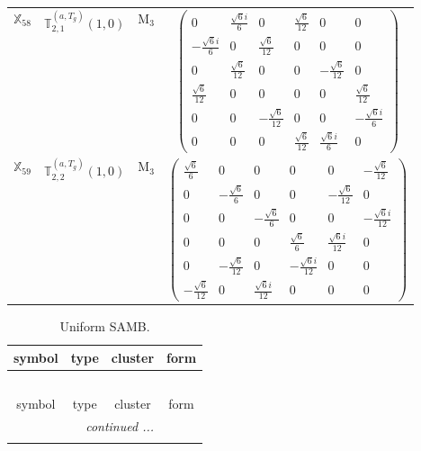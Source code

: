 \documentclass[fleqn,10pt,landscape]{article}
\begin{document}
\begin{itemize}
\begin{center}
\begin{longtable}{c|c|c|c}
$ \mathbb{X}_{58} $ & $\mathbb{T}_{2,1}^{(a,T_{g})}(1,0)$ & M$_{3}$ & $\begin{pmatrix} 0 & \frac{\sqrt{6} i}{6} & 0 & \frac{\sqrt{6}}{12} & 0 & 0 \\ - \frac{\sqrt{6} i}{6} & 0 & \frac{\sqrt{6}}{12} & 0 & 0 & 0 \\ 0 & \frac{\sqrt{6}}{12} & 0 & 0 & - \frac{\sqrt{6}}{12} & 0 \\ \frac{\sqrt{6}}{12} & 0 & 0 & 0 & 0 & \frac{\sqrt{6}}{12} \\ 0 & 0 & - \frac{\sqrt{6}}{12} & 0 & 0 & - \frac{\sqrt{6} i}{6} \\ 0 & 0 & 0 & \frac{\sqrt{6}}{12} & \frac{\sqrt{6} i}{6} & 0 \end{pmatrix}$ \\
$ \mathbb{X}_{59} $ & $\mathbb{T}_{2,2}^{(a,T_{g})}(1,0)$ & M$_{3}$ & $\begin{pmatrix} \frac{\sqrt{6}}{6} & 0 & 0 & 0 & 0 & - \frac{\sqrt{6}}{12} \\ 0 & - \frac{\sqrt{6}}{6} & 0 & 0 & - \frac{\sqrt{6}}{12} & 0 \\ 0 & 0 & - \frac{\sqrt{6}}{6} & 0 & 0 & - \frac{\sqrt{6} i}{12} \\ 0 & 0 & 0 & \frac{\sqrt{6}}{6} & \frac{\sqrt{6} i}{12} & 0 \\ 0 & - \frac{\sqrt{6}}{12} & 0 & - \frac{\sqrt{6} i}{12} & 0 & 0 \\ - \frac{\sqrt{6}}{12} & 0 & \frac{\sqrt{6} i}{12} & 0 & 0 & 0 \end{pmatrix}$ \\
\end{longtable}
\end{center}
\begin{center}
\renewcommand{\arraystretch}{1.3}
\begin{longtable}{c|c|c|c}
\caption{Uniform SAMB.}
 \\
 \hline \hline
symbol & type & cluster & form \\ \hline \endfirsthead

\multicolumn{3}{l}{\tablename\ \thetable{}} \\
 \hline \hline
symbol & type & cluster & form \\ \hline \endhead

 \hline \hline
\multicolumn{3}{r}{\footnotesize\it continued ...} \\ \endfoot


\end{longtable}
\end{center}
\end{itemize}
\end{document}
